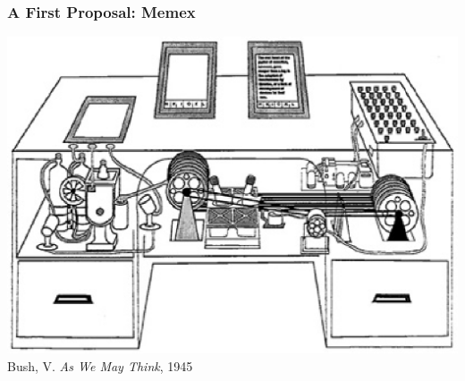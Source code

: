 \documentclass[svgnames]{beamer}
\begin{document}

\begin{frame}
   \frametitle{A First Proposal: Memex}
  
  \begin{center}
    \includegraphics[width=.8\linewidth]{memex}\\
    \raggedleft \footnotesize Bush, V. \textit{As We May Think}, 1945
  \end{center}

\end{frame}
\end{document}
